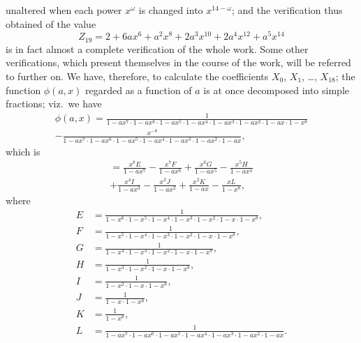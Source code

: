 \documentclass[11pt,a4paper]{book}
\begin{document}
\clearpage
unaltered when each power $x^\omega$ is changed into $x^{14-\omega}$; and the verification thus obtained of the value
\[
Z_{19} = 2 + 6ax^6 + a^2x^8 + 2a^3x^{10} + 2a^4x^{12} + a^5x^{14}
\]
is in fact almost a complete verification of the whole work. Some other verifications, which present themselves in the course of the work, will be referred to further on. We have, therefore, to calculate the coefficients $X_0$, $X_1$, \dots, $X_{18}$; the function $\phi(a, x)$ regarded as a function of $a$ is at once decomposed into simple fractions; viz.\ we have
\begin{multline*}
\phi(a, x) = \frac{1}{1 - ax^7 \cdot 1 - ax^6 \cdot 1 - ax^5 \cdot 1 - ax^4 \cdot 1 - ax^3 \cdot 1 - ax^2 \cdot 1 - ax \cdot 1 - x^8} \\
- \frac{x^{-8}}{1 - ax^7 \cdot 1 - ax^6 \cdot 1 - ax^5 \cdot 1 - ax^4 \cdot 1 - ax^3 \cdot 1 - ax^2 \cdot 1 - ax},
\end{multline*}
which is
\begin{multline*}
= \frac{x^8E}{1 - ax^7} - \frac{x^7F}{1 - ax^6} + \frac{x^6G}{1 - ax^5} - \frac{x^5H}{1 - ax^4} \\
+ \frac{x^4I}{1 - ax^3} - \frac{x^3J}{1 - ax^2} + \frac{x^2K}{1 - ax} - \frac{xL}{1 - x^8},
\end{multline*}
where
\begin{align*}
E &= \frac{1}{1 - x^6 \cdot 1 - x^5 \cdot 1 - x^4 \cdot 1 - x^3 \cdot 1 - x^2 \cdot 1 - x \cdot 1 - x^8}, \\
F &= \frac{1}{1 - x^5 \cdot 1 - x^4 \cdot 1 - x^3 \cdot 1 - x^2 \cdot 1 - x \cdot 1 - x^8}, \\
G &= \frac{1}{1 - x^4 \cdot 1 - x^3 \cdot 1 - x^2 \cdot 1 - x \cdot 1 - x^8}, \\
H &= \frac{1}{1 - x^3 \cdot 1 - x^2 \cdot 1 - x \cdot 1 - x^8}, \\
I &= \frac{1}{1 - x^2 \cdot 1 - x \cdot 1 - x^8}, \\
J &= \frac{1}{1 - x \cdot 1 - x^8}, \\
K &= \frac{1}{1 - x^8}, \\
L &= \frac{1}{1 - ax^7 \cdot 1 - ax^6 \cdot 1 - ax^5 \cdot 1 - ax^4 \cdot 1 - ax^3 \cdot 1 - ax^2 \cdot 1 - ax}.
\end{align*}
\end{document}
